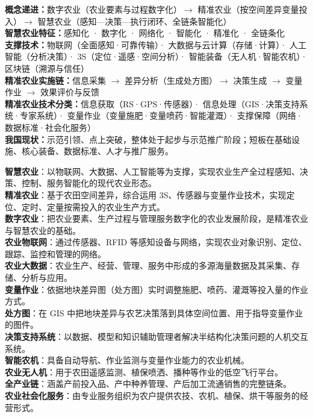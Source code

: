 \documentclass[a4paper,11pt]{article}
\begin{document}

\begin{knowmap}
\textbf{概念递进：}数字农业（农业要素与过程数字化）$\rightarrow$ 精准农业（按空间差异变量投入）$\rightarrow$ 智慧农业（感知—决策—执行闭环、全链条智能化）\\[2pt]
\textbf{智慧农业特征：}感知化 · 数字化 · 网络化 · 智能化 · 精准化 · 全链条化\\[2pt]
\textbf{支撑技术：}物联网（全面感知·可靠传输）· 大数据与云计算（存储·计算）· 人工智能（分析决策）· 3S（定位·遥感·空间分析）· 智能装备（无人机·智能农机）· 区块链（溯源与信任）\\[2pt]
\textbf{精准农业实施链：}信息采集 $\rightarrow$ 差异分析（生成处方图）$\rightarrow$ 决策生成 $\rightarrow$ 变量作业 $\rightarrow$ 效果评价与反馈\\[2pt]
\textbf{精准农业技术分类：}信息获取（RS·GPS·传感器）· 信息处理（GIS·决策支持系统·专家系统）· 变量作业（变量施肥·变量喷药·智能灌溉）· 支撑保障（网络·数据标准·社会化服务）\\[2pt]
\textbf{我国现状：}示范引领、点上突破，整体处于起步与示范推广阶段；短板在基础设施、核心装备、数据标准、人才与推广服务。
\end{knowmap}

\begin{keyterms}
\textbf{智慧农业}：以物联网、大数据、人工智能等为支撑，实现农业生产全过程感知、决策、控制、服务智能化的现代农业形态。\\
\textbf{精准农业}：基于农田空间差异，综合运用 3S、传感器与变量作业技术，实现定位、定时、定量按需投入的农业生产方式。\\
\textbf{数字农业}：把农业要素、生产过程与管理服务数字化的农业发展阶段，是精准农业与智慧农业的基础。\\
\textbf{农业物联网}：通过传感器、RFID 等感知设备与网络，实现农业对象识别、定位、跟踪、监控和管理的网络。\\
\textbf{农业大数据}：农业生产、经营、管理、服务中形成的多源海量数据及其采集、存储、分析与应用。\\
\textbf{变量作业}：依据地块差异图（处方图）实时调整施肥、喷药、灌溉等投入量的作业方式。\\
\textbf{处方图}：在 GIS 中把地块差异与农艺决策落到具体空间位置、用于指导变量作业的图件。\\
\textbf{决策支持系统}：以数据、模型和知识辅助管理者解决半结构化决策问题的人机交互系统。\\
\textbf{智能农机}：具备自动导航、作业监测与变量作业能力的农业机械。\\
\textbf{农业无人机}：用于农田遥感监测、植保喷洒、播种等作业的低空飞行平台。\\
\textbf{全产业链}：涵盖产前投入品、产中种养管理、产后加工流通销售的完整链条。\\
\textbf{农业社会化服务}：由专业服务组织为农户提供农技、农机、植保、烘干等服务的经营形式。
\end{keyterms}
\end{document}
